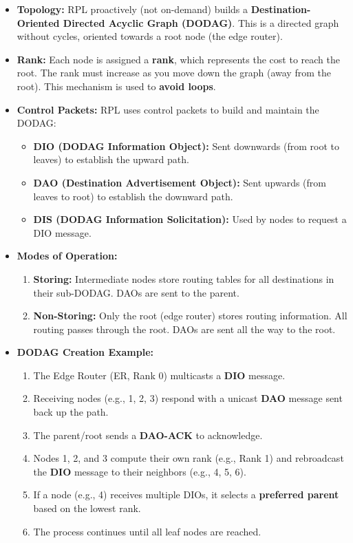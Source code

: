 \documentclass[a4paper, 12pt]{book} %
\begin{document}
\begin{itemize}
\tightlist
\item
  \textbf{Topology:} RPL proactively (not on-demand) builds a
  \textbf{Destination-Oriented Directed Acyclic Graph (DODAG)}. This is
  a directed graph without cycles, oriented towards a root node (the
  edge router).
\item
  \textbf{Rank:} Each node is assigned a \textbf{rank}, which represents
  the cost to reach the root. The rank must increase as you move down
  the graph (away from the root). This mechanism is used to
  \textbf{avoid loops}.
\item
  \textbf{Control Packets:} RPL uses control packets to build and
  maintain the DODAG:

  \begin{itemize}
  \tightlist
  \item
    \textbf{DIO (DODAG Information Object):} Sent downwards (from root
    to leaves) to establish the upward path.
  \item
    \textbf{DAO (Destination Advertisement Object):} Sent upwards (from
    leaves to root) to establish the downward path.
  \item
    \textbf{DIS (DODAG Information Solicitation):} Used by nodes to
    request a DIO message.
  \end{itemize}
\item
  \textbf{Modes of Operation:}

  \begin{enumerate}
  \def\labelenumi{\arabic{enumi}.}
  \tightlist
  \item
    \textbf{Storing:} Intermediate nodes store routing tables for all
    destinations in their sub-DODAG. DAOs are sent to the parent.
  \item
    \textbf{Non-Storing:} Only the root (edge router) stores routing
    information. All routing passes through the root. DAOs are sent all
    the way to the root.
  \end{enumerate}
\item
  \textbf{DODAG Creation Example:}

  \begin{enumerate}
  \def\labelenumi{\arabic{enumi}.}
  \tightlist
  \item
    The Edge Router (ER, Rank 0) multicasts a \textbf{DIO} message.
  \item
    Receiving nodes (e.g., 1, 2, 3) respond with a unicast \textbf{DAO}
    message sent back up the path.
  \item
    The parent/root sends a \textbf{DAO-ACK} to acknowledge.
  \item
    Nodes 1, 2, and 3 compute their own rank (e.g., Rank 1) and
    rebroadcast the \textbf{DIO} message to their neighbors (e.g., 4, 5,
    6).
  \item
    If a node (e.g., 4) receives multiple DIOs, it selects a
    \textbf{preferred parent} based on the lowest rank.
  \item
    The process continues until all leaf nodes are reached.
  \end{enumerate}
\end{itemize}
\end{document}
